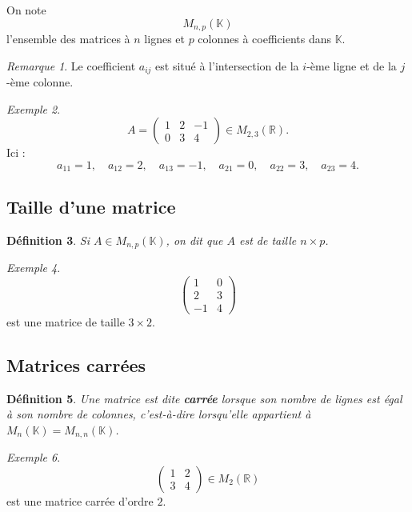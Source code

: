 \documentclass[11pt,a4paper]{article}
\newtheorem{definition}{Définition}[section]
\theoremstyle{remark}
\newtheorem{remarque}[definition]{Remarque}
\newtheorem{exemple}[definition]{Exemple}
\newcommand{\R}{\mathbb{R}}
\newcommand{\K}{\mathbb{K}}
\begin{document}
On note
\[
M_{n,p}(\K)
\]
l’ensemble des matrices à \(n\) lignes et \(p\) colonnes à coefficients dans \(\K\).

\begin{remarque}
Le coefficient \(a_{ij}\) est situé à l’intersection de la \(i\)-ème ligne et de la \(j\)-ème colonne.
\end{remarque}

\begin{exemple}
\[
A=
\begin{pmatrix}
1 & 2 & -1\\
0 & 3 & 4
\end{pmatrix}
\in M_{2,3}(\R).
\]
Ici :
\[
a_{11}=1,\quad a_{12}=2,\quad a_{13}=-1,\quad a_{21}=0,\quad a_{22}=3,\quad a_{23}=4.
\]
\end{exemple}

\subsection{Taille d’une matrice}

\begin{definition}
Si \(A\in M_{n,p}(\K)\), on dit que \(A\) est de taille \(n\times p\).
\end{definition}

\begin{exemple}
\[
\begin{pmatrix}
1 & 0\\
2 & 3\\
-1 & 4
\end{pmatrix}
\]
est une matrice de taille \(3\times 2\).
\end{exemple}

\subsection{Matrices carrées}

\begin{definition}
Une matrice est dite \textbf{carrée} lorsque son nombre de lignes est égal à son nombre de colonnes, c’est-à-dire lorsqu’elle appartient à \(M_n(\K)=M_{n,n}(\K)\).
\end{definition}

\begin{exemple}
\[
\begin{pmatrix}
1 & 2\\
3 & 4
\end{pmatrix}
\in M_2(\R)
\]
est une matrice carrée d’ordre \(2\).
\end{exemple}
\end{document}
